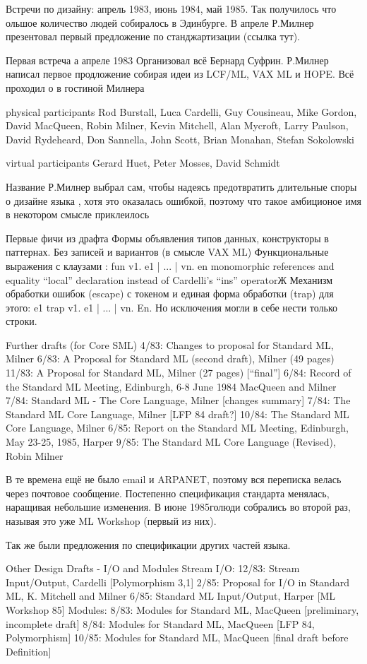 \documentclass[14pt]{matmex-diploma-custom}
\begin{document}
 Встречи по дизайну: апрель 1983, июнь 1984, май 1985. Так получилось что ольшое количество людей собиралось в Эдинбурге. В апреле Р.Милнер презентовал первый предложение по станджартизации (ссылка тут). 

Первая встреча а апреле 1983
Организовал всё Бернард Суфрин. Р.Милнер написал первое продложение  собирая идеи из LCF/ML, VAX ML и HOPE. Всё проходил о в гостиной Милнера

physical participants
Rod Burstall, Luca Cardelli, Guy Cousineau, Mike Gordon, David MacQueen, Robin Milner, Kevin Mitchell, Alan Mycroft, Larry Paulson, David Rydeheard, Don Sannella, John Scott, Brian Monahan, Stefan Sokolowski

virtual participants
Gerard Huet, Peter Mosses, David Schmidt

Название Р.Милнер выбрал сам, чтобы надеясь предотвратить длительные споры о дизайне языка , хотя это оказалась ошибкой, поэтому что такое амбиционое имя в некотором смысле приклеилось

Первые фичи из драфта
Формы объявления типов данных, конструкторы в паттернах.
Без записей и вариантов (в смысле VAX ML)
Функциональные выражения с клаузами :  fun v1. e1 | ... | vn. en
monomorphic references and equality
“local” declaration instead of Cardelli’s “ins” operatorЖ
Механизм обработки ошибок (escape) с токеном и единая форма обработки (trap) для этого:
e1 trap v1. e1 | ... | vn. En. Но исключения могли в себе нести только строки.


Further drafts (for Core SML)
4/83: Changes to proposal for Standard ML, Milner
6/83: A Proposal for Standard ML (second draft), Milner (49 pages)
11/83: A Proposal for Standard ML, Milner (27 pages) [“final”]
6/84: Record of the Standard ML Meeting, Edinburgh, 6-8 June 1984
MacQueen and Milner
7/84: Standard ML - The Core Language, Milner [changes summary]
7/84: The Standard ML Core Language, Milner [LFP 84 draft?]
10/84: The Standard ML Core Language, Milner
6/85: Report on the Standard ML Meeting, Edinburgh, May 23-25, 1985, Harper
9/85: The Standard ML Core Language (Revised), Robin Milner

В те времена ещё не было email и ARPANET, поэтому вся переписка велась через почтовое сообщение. Постепенно спецификация стандарта менялась, наращивая небольшие изменения. В июне 1985голюди собрались во второй раз, называя это уже ML Workshop (первый из них).

Так же были предложения по спецификации  других частей языка.

Other Design Drafts - I/O and Modules
Stream I/O:
12/83: Stream Input/Output, Cardelli [Polymorphism 3,1]
2/85: Proposal for I/O in Standard ML, K. Mitchell and Milner
6/85: Standard ML Input/Output, Harper [ML Workshop 85]
Modules:
8/83: Modules for Standard ML, MacQueen [preliminary, incomplete draft]
8/84: Modules for Standard ML, MacQueen [LFP 84, Polymorphism]
10/85: Modules for Standard ML, MacQueen [final draft before Definition]
\end{document}
